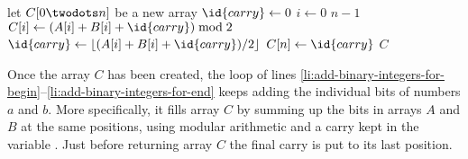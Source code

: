 \begin{codebox}
\li let $C[0\twodots n]$ be a new array
\li $\id{carry}\gets0$
\li \For $i\gets0$ \To $n-1$ \label{li:add-binary-integers-for-begin}
\li     \Do $C[i]\gets(A[i]+B[i]+\id{carry})\bmod2$
\li         $\id{carry}\gets\lfloor(A[i]+B[i]+\id{carry})/2\rfloor$
        \End \label{li:add-binary-integers-for-end}
\li $C[n]\gets\id{carry}$
\li \Return $C$
\end{codebox}

Once the array $C$ has been created, the  loop of lines \ref{li:add-binary-integers-for-begin}--\ref{li:add-binary-integers-for-end} keeps adding the individual bits of numbers $a$ and $b$.
More specifically, it fills array $C$ by summing up the bits in arrays $A$ and $B$ at the same positions, using modular arithmetic and a carry kept in the variable .
Just before returning array $C$ the final carry is put to its last position.
